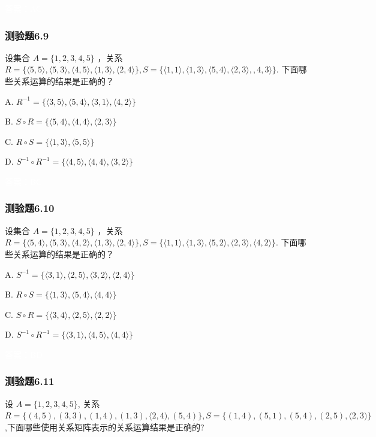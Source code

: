 \documentclass[UTF8, heading=true]{ctexart}
\begin{document}
\textcolor{white}{答案：AC}

\subsubsection{测验题6.9}

设集合 $A=\{1,2,3,4,5\}$ ，关系 $R=\{\langle 5,5\rangle,\langle 5,3\rangle,\langle 4,5\rangle,\langle 1,3\rangle,\langle 2,4\rangle\}, S=\{\langle 1,1\rangle,\langle 1,3\rangle,\langle 5,4\rangle,\langle 2,3\rangle,, 4,3\rangle\}$.
下面哪些关系运算的结果是正确的？

A. $ R^{-1}=\{\langle 3,5\rangle,\langle 5,4\rangle,\langle 3,1\rangle,\langle 4,2\rangle\} $

B. $S \circ R=\{\langle 5,4\rangle,\langle 4,4\rangle,\langle 2,3\rangle\} $

C. $ R \circ S=\{\langle 1,3\rangle,\langle 5,5\rangle\} $

D. $ S^{-1} \circ R^{-1}=\{\langle 4,5\rangle,\langle 4,4\rangle,\langle 3,2\rangle\}$

\textcolor{white}{答案：BC}


\subsubsection{测验题6.10}

设集合 $A=\{1,2,3,4,5\}$ ，关系 $R=\{\langle 5,4\rangle,\langle 5,3\rangle,\langle 4,2\rangle,\langle 1,3\rangle,\langle 2,4\rangle\}, S=\{\langle 1,1\rangle,\langle 1,3\rangle,\langle 5,2\rangle,\langle 2,3\rangle,\langle 4,2\rangle\}$.
下面哪些关系运算的结果是正确的？

A. $S^{-1}=\{\langle 3,1\rangle,\langle 2,5\rangle,\langle 3,2\rangle,\langle 2,4\rangle\}$

B. $R \circ S=\{\langle 1,3\rangle,\langle 5,4\rangle,\langle 4,4\rangle\}$

C. $ S \circ R=\{\langle 3,4\rangle,\langle 2,5\rangle,\langle 2,2\rangle\}$

D. $ S^{-1} \circ R^{-1}=\{\langle 3,1\rangle,\langle 4,5\rangle,\langle 4,4\rangle\}$

\textcolor{white}{答案：BD}



\subsubsection{测验题6.11}

设 $A=\{1,2,3,4,5\}$, 关系 $R=\{(4,5),(3,3),(1,4),(1,3),\langle 2,4),(5,4)\}, S=\{(1,4),(5,1),(5,4),(2,5),\langle 2,3)\}$,下面哪些使用关系矩阵表示的关系运算结果是正确的?
\end{document}
